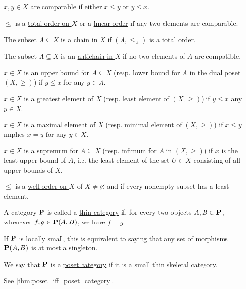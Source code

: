 \begin{definition}
\begin{defenum}
    \item\label{def:poset/comparable_elements} $x, y \in X$ are \uline{comparable} if either $x \leq y$ or $y \leq x$.
    \item\label{def:poset/total_order} $\leq$ is a \uline{total order on $X$} or a \uline{linear order} if any two elements are comparable.
    \item\label{def:poset/chain} The subset $A \subseteq X$ is a \uline{chain in $X$} if $(A, \leq_A)$ is a total order.
    \item\label{def:poset/antichain} The subset $A \subseteq X$ is an \uline{antichain in $X$} if no two elements of $A$ are compatible.
    \item\label{def:poset/upper_lower_bound} $x \in X$ is an \uline{upper bound for $A \subseteq X$} (resp. \uline{lower bound} for $A$ in the dual poset $(X, \geq)$) if $y \leq x$ for any $y \in A$.
    \item\label{def:poset/greatest_least_element} $x \in X$ is a \uline{greatest element of $X$} (resp. \uline{least element of $(X, \geq)$}) if $y \leq x$ any $y \in X$.
    \item\label{def:poset/maximal_minimal_element} $x \in X$ is a \uline{maximal element of $X$} (resp. \uline{minimal element of $(X, \geq)$}) if $x \leq y$ implies $x = y$ for any $y \in X$.
    \item\label{def:poset/supremum_infimum} $x \in X$ is a \uline{supremum for $A \subseteq X$} (resp. \uline{infimum for $A$ in $(X, \geq)$}) if $x$ is the least upper bound of $A$, i.e. the least element of the set $U \subset X$ consisting of all upper bounds of $X$.
    \item\label{def:poset/well_order} $\leq$ is a \uline{well-order on $X$} of $X \neq \varnothing$ and if every nonempty subset has a least element.
  \end{defenum}
\end{definition}

\begin{definition}\label{def:thin_category}\cite{nLab:thin_category}
  A category $\operatorname{\mathbf{P}}$ is called a \uline{thin category} if, for every two objects $A, B \in \operatorname{\mathbf{P}}$, whenever $f, g \in \operatorname{\mathbf{P}}(A, B)$, we have $f = g$.

  If $\operatorname{\mathbf{P}}$ is locally small, this is equivalent to saying that any set of morphisms $\operatorname{\mathbf{P}}(A, B)$ is at most a singleton.
\end{definition}

\begin{definition}\label{def:poset_category}
  We say that $\operatorname{\mathbf{P}}$ is a \uline{poset category} if it is a small thin skeletal category.

  See \cref{thm:poset_iff_poset_category}.
\end{definition}

